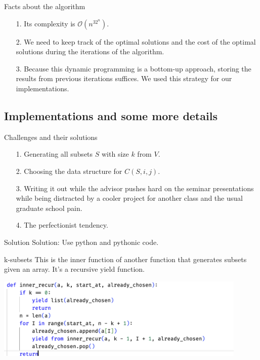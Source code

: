 \documentclass[11pt]{beamer}
\begin{document}
    \begin{frame}{Facts about the algorithm}
        \begin{itemize}
            \item [1.] Its complexity is $\mathcal{O}(n^32^n)$. 
            \item [2.] We need to keep track of the optimal solutions and the cost of the optimal solutions during the iterations of the algorithm. 
            \item [3.] Because this dynamic programming is a bottom-up approach, storing the results from previous iterations suffices. We used this strategy for our implementations. 
        \end{itemize}
    \end{frame}
\subsection{Implementations and some more details}
    \begin{frame}{Challenges and their solutions}
        \begin{itemize}
            \item [1.] Generating all subsets $S$ with size $k$ from $V$. 
            \item [2.] Choosing the data structure for $C(S, i, j)$. 
            \item [3.] Writing it out while the advisor pushes hard on the seminar presentations while being distracted by a cooler project for another class and the usual graduate school pain. 
            \item [4.] The perfectionist tendency. 
        \end{itemize}
        \pause
        \begin{block}{Solution}
            Solution: Use python and pythonic code. 
        \end{block}
    \end{frame}
    \begin{frame}{k-subsets}
        This is the inner function of another function that generates subsets given an array. It's a recursive yield function. 
        \begin{center}
            \includegraphics[width=12cm]{k_subsets.png}    
        \end{center}
    \end{frame}
\end{document}
